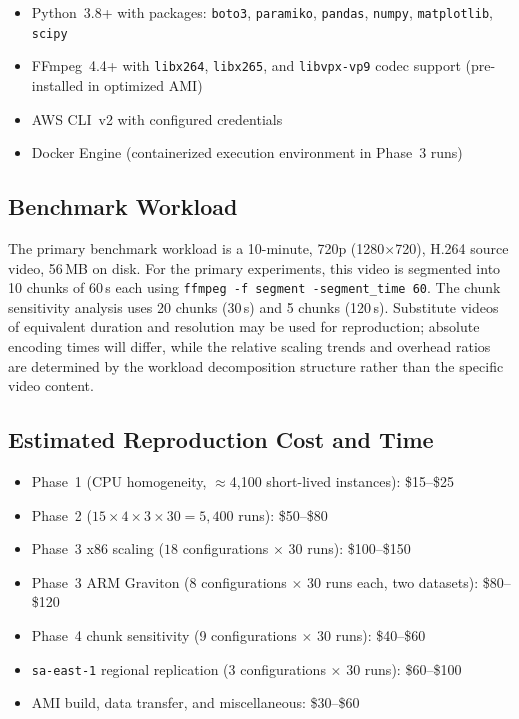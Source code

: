 \documentclass[conference]{IEEEtran}
\begin{document}
\begin{itemize}
  \item Python~3.8+ with packages: \texttt{boto3}, \texttt{paramiko},
        \texttt{pandas}, \texttt{numpy}, \texttt{matplotlib}, \texttt{scipy}
  \item FFmpeg~4.4+ with \texttt{libx264}, \texttt{libx265}, and
        \texttt{libvpx-vp9} codec support (pre-installed in optimized AMI)
  \item AWS CLI~v2 with configured credentials
  \item Docker Engine (containerized execution environment in Phase~3 runs)
\end{itemize}

\subsection{Benchmark Workload}

The primary benchmark workload is a 10-minute, 720p (1280$\times$720), H.264
source video, 56\,MB on disk. For the primary experiments, this video is
segmented into 10 chunks of 60\,s each using
\texttt{ffmpeg -f segment -segment\_time 60}. The chunk sensitivity analysis
uses 20 chunks (30\,s) and 5 chunks (120\,s). Substitute videos of equivalent
duration and resolution may be used for reproduction; absolute encoding times
will differ, while the relative scaling trends and overhead ratios are
determined by the workload decomposition structure rather than the specific
video content.

\subsection{Estimated Reproduction Cost and Time}

\begin{itemize}
  \item Phase~1 (CPU homogeneity, $\approx$4,100 short-lived instances):
        \$15--\$25
  \item Phase~2 ($15 \times 4 \times 3 \times 30 = 5{,}400$ runs):
        \$50--\$80
  \item Phase~3 x86 scaling ($18$ configurations $\times$ 30 runs):
        \$100--\$150
  \item Phase~3 ARM Graviton (8 configurations $\times$ 30 runs each, two datasets):
        \$80--\$120
  \item Phase~4 chunk sensitivity (9 configurations $\times$ 30 runs):
        \$40--\$60
  \item \texttt{sa-east-1} regional replication (3 configurations $\times$ 30 runs):
        \$60--\$100
  \item AMI build, data transfer, and miscellaneous: \$30--\$60
\end{itemize}
\end{document}
